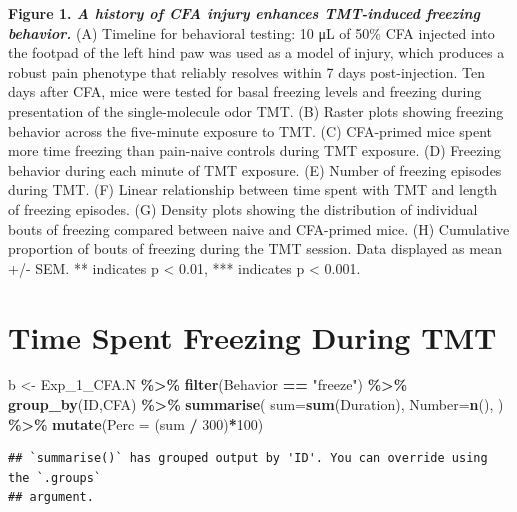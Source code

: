 \documentclass[
]{book}
\newenvironment{Shaded}{\begin{snugshade}}{\end{snugshade}}
\newcommand{\AttributeTok}[1]{\textcolor[rgb]{0.13,0.29,0.53}{#1}}
\newcommand{\DecValTok}[1]{\textcolor[rgb]{0.00,0.00,0.81}{#1}}
\newcommand{\FunctionTok}[1]{\textcolor[rgb]{0.13,0.29,0.53}{\textbf{#1}}}
\newcommand{\NormalTok}[1]{#1}
\newcommand{\OtherTok}[1]{\textcolor[rgb]{0.56,0.35,0.01}{#1}}
\newcommand{\SpecialCharTok}[1]{\textcolor[rgb]{0.81,0.36,0.00}{\textbf{#1}}}
\newcommand{\StringTok}[1]{\textcolor[rgb]{0.31,0.60,0.02}{#1}}
\begin{document}
\textbf{Figure 1. \emph{A history of CFA injury enhances TMT-induced freezing behavior.}} (A) Timeline for behavioral testing: 10 μL of 50\% CFA injected into the footpad of the left hind paw was used as a model of injury, which produces a robust pain phenotype that reliably resolves within 7 days post-injection. Ten days after CFA, mice were tested for basal freezing levels and freezing during presentation of the single-molecule odor TMT. (B) Raster plots showing freezing behavior across the five-minute exposure to TMT. (C) CFA-primed mice spent more time freezing than pain-naive controls during TMT exposure. (D) Freezing behavior during each minute of TMT exposure. (E) Number of freezing episodes during TMT. (F) Linear relationship between time spent with TMT and length of freezing episodes. (G) Density plots showing the distribution of individual bouts of freezing compared between naive and CFA-primed mice. (H) Cumulative proportion of bouts of freezing during the TMT session. Data displayed as mean +/- SEM. ** indicates p \textless{} 0.01, *** indicates p \textless{} 0.001.

\section*{Time Spent Freezing During TMT}\label{time-spent-freezing-during-tmt}

\begin{Shaded}
\begin{Highlighting}[]
\NormalTok{b }\OtherTok{\textless{}{-}}\NormalTok{ Exp\_1\_CFA.N  }\SpecialCharTok{\%\textgreater{}\%}
  \FunctionTok{filter}\NormalTok{(Behavior }\SpecialCharTok{==} \StringTok{"freeze"}\NormalTok{) }\SpecialCharTok{\%\textgreater{}\%}
  \FunctionTok{group\_by}\NormalTok{(ID,CFA) }\SpecialCharTok{\%\textgreater{}\%}
  \FunctionTok{summarise}\NormalTok{(}
    \AttributeTok{sum=}\FunctionTok{sum}\NormalTok{(Duration),}
    \AttributeTok{Number=}\FunctionTok{n}\NormalTok{(),}
\NormalTok{  ) }\SpecialCharTok{\%\textgreater{}\%}
  \FunctionTok{mutate}\NormalTok{(}\AttributeTok{Perc =}\NormalTok{ (sum }\SpecialCharTok{/} \DecValTok{300}\NormalTok{)}\SpecialCharTok{*}\DecValTok{100}\NormalTok{)}
\end{Highlighting}
\end{Shaded}

\begin{verbatim}
## `summarise()` has grouped output by 'ID'. You can override using the `.groups`
## argument.
\end{verbatim}
\end{document}
